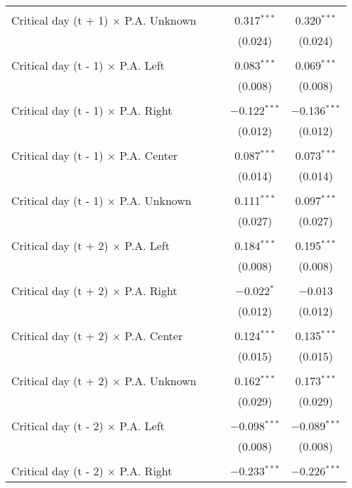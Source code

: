 \documentclass[
]{article}
\begin{document}
\begin{table}[!htbp]
{\begin{tabular}{@{\extracolsep{5pt}}lcccc}
  & & & & \\ 
 Critical day (t + 1) $\times$ P.A. Unknown &  &  & 0.317$^{***}$ & 0.320$^{***}$ \\ 
  &  &  & (0.024) & (0.024) \\ 
  & & & & \\ 
 Critical day (t - 1) $\times$ P.A. Left &  &  & 0.083$^{***}$ & 0.069$^{***}$ \\ 
  &  &  & (0.008) & (0.008) \\ 
  & & & & \\ 
 Critical day (t - 1) $\times$ P.A. Right &  &  & $-$0.122$^{***}$ & $-$0.136$^{***}$ \\ 
  &  &  & (0.012) & (0.012) \\ 
  & & & & \\ 
 Critical day (t - 1) $\times$ P.A. Center &  &  & 0.087$^{***}$ & 0.073$^{***}$ \\ 
  &  &  & (0.014) & (0.014) \\ 
  & & & & \\ 
 Critical day (t - 1) $\times$ P.A. Unknown &  &  & 0.111$^{***}$ & 0.097$^{***}$ \\ 
  &  &  & (0.027) & (0.027) \\ 
  & & & & \\ 
 Critical day (t + 2) $\times$ P.A. Left &  &  & 0.184$^{***}$ & 0.195$^{***}$ \\ 
  &  &  & (0.008) & (0.008) \\ 
  & & & & \\ 
 Critical day (t + 2) $\times$ P.A. Right &  &  & $-$0.022$^{*}$ & $-$0.013 \\ 
  &  &  & (0.012) & (0.012) \\ 
  & & & & \\ 
 Critical day (t + 2) $\times$ P.A. Center &  &  & 0.124$^{***}$ & 0.135$^{***}$ \\ 
  &  &  & (0.015) & (0.015) \\ 
  & & & & \\ 
 Critical day (t + 2) $\times$ P.A. Unknown &  &  & 0.162$^{***}$ & 0.173$^{***}$ \\ 
  &  &  & (0.029) & (0.029) \\ 
  & & & & \\ 
 Critical day (t - 2) $\times$ P.A. Left &  &  & $-$0.098$^{***}$ & $-$0.089$^{***}$ \\ 
  &  &  & (0.008) & (0.008) \\ 
  & & & & \\ 
 Critical day (t - 2) $\times$ P.A. Right &  &  & $-$0.233$^{***}$ & $-$0.226$^{***}$ \\ 

\end{tabular}}
\end{table}
\end{document}
